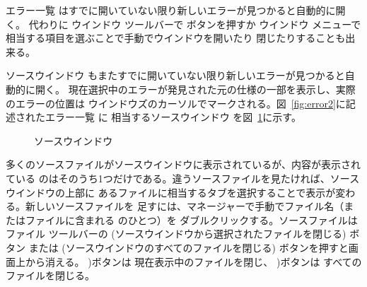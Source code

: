 \documentclass[\pformat,12pt]{jarticle}
\newcommand{\guicmd}[1]{{\gt #1}}
\begin{document}
\guicmd{エラー一覧} はすでに開いていない限り新しいエラーが見つかると自動的に開く。
代わりに \guicmd{ウインドウ} ツールバーで 
ボタンを押すか
\guicmd{ウインドウ} メニューで相当する項目を選ぶことで手動でウインドウを開いたり
閉じたりすることも出来る。

\guicmd{ソースウインドウ} もまたすでに開いていない限り新しいエラーが見つかると自動的に開く。
現在選択中のエラーが発見された元の仕様の一部を表示し、実際のエラーの位置は
ウインドウズのカーソルでマークされる。図~\ref{fig:error2}に記述された\guicmd{エラー一覧} に
相当する\guicmd{ソースウインドウ} を図~\ref{fig:source2}に示す。

\begin{figure}[tbh]
\begin{center}
\caption{ソースウインドウ}
\label{fig:source2}
\end{center}
\end{figure}


多くのソースファイルが\guicmd{ソースウインドウ}に表示されているが、内容が表示されている
のはそのうち1つだけである。違うソースファイルを見たければ、\guicmd{ソースウインドウ}の上部に
あるファイルに相当するタブを選択することで表示が変わる。新しいソースファイルを
足すには、\guicmd{マネージャー}で手動でファイル名（またはファイルに含まれる
 のひとつ）を
ダブルクリックする。ソースファイルは\guicmd{ファイル} ツールバーの 
(\guicmd{ソースウインドウから選択されたファイルを閉じる}) ボタン
または 
(\guicmd{ソースウインドウのすべてのファイルを閉じる}) ボタンを押すと画面上から消える。 
)ボタンは
現在表示中のファイルを閉じ、
)ボタンは
すべてのファイルを閉じる。
\end{document}
